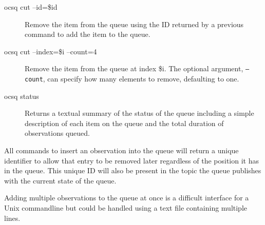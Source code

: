\documentclass[TS,toc,lsstdraft]{lsstdoc}
\begin{document}
\begin{description}
\item[ocsq cut --id=\$id]

Remove the item from the queue using the ID returned by a previous command to add the item to the queue.

\item[ocsq cut --index=\$i --count=4]

Remove the item from the queue at index \$i.
The optional argument, \texttt{--count}, can specify how many elements to remove, defaulting to one.

\item[ocsq status]

Returns a textual summary of the status of the queue including a simple description of each item on the queue and the total duration of observations queued.

\end{description}

All commands to insert an observation into the queue will return a unique identifier to allow that entry to be removed later regardless of the position it has in the queue.
This unique ID will also be present in the topic the queue publishes with the current state of the queue.

Adding multiple observations to the queue at once is a difficult interface for a Unix commandline but could be handled using a text file containing multiple lines.
\end{document}
